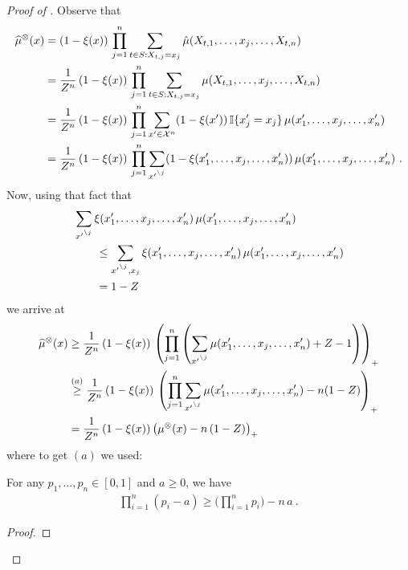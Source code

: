 \begin{proof}[Proof of ]
Observe that
\begin{align*}
  \widehat \mu^{\otimes}(x)
  &=
    (1-\xi(x)) \, \prod_{j=1}^n \sum_{t \in S : X_{t,j} = x_j} \hat \mu(X_{t,1}, \ldots, x_j, \ldots, X_{t,n})\\
  &=
    \frac{1}{Z^n} \, (1-\xi(x)) \, \prod_{j=1}^n \sum_{t \in S : X_{t,j} = x_j} \mu(X_{t,1}, \ldots, x_j, \ldots, X_{t,n})\\
  &=
    \frac{1}{Z^n} \, (1-\xi(x)) \, \prod_{j=1}^n \sum_{x' \in {\mathcal{X}}^n} (1-\xi(x')) \, \mathbb{I}\{x'_j = x_j\} \, \mu(x_1', \ldots, x_j, \ldots, x_n')\\
  &=
    \frac{1}{Z^n} \, (1-\xi(x)) \, \prod_{j=1}^n \sum_{{x'}^{^{\backslash j}}} (1-\xi(x'_1, \ldots, x_j, \ldots, x'_n)) \, \mu(x_1', \ldots, x_j, \ldots, x_n')~.
\end{align*}
% 
Now, using that fact that
\begin{align*}
  &\sum_{{x'}^{^{\backslash j}}} \xi(x'_1, \ldots, x_j, \ldots, x'_n) \, \mu(x_1', \ldots, x_j, \ldots, x_n')\\
  &\qquad\leq
    \sum_{{x'}^{^{\backslash j}}, x_j} \xi(x'_1, \ldots, x_j, \ldots, x'_n) \, \mu(x_1', \ldots, x_j, \ldots, x_n')\\
  &\qquad= 1-Z
\end{align*}
we arrive at
%
\begin{align*}
  \widehat \mu^{\otimes}(x)
  &\geq
    \frac{1}{Z^n} \, (1-\xi(x)) \, \left(  \prod_{j=1}^n \left(  \sum_{{x'}^{^{\backslash j}}} \mu(x_1', \ldots, x_j, \ldots, x_n')
    + Z - 1
     \right) \right)_+\\
  &\stackrel{(a)}{\geq}
    \frac{1}{Z^n} \, (1-\xi(x)) \, \left(  \prod_{j=1}^n \sum_{{x'}^{^{\backslash j}}}  \mu(x_1', \ldots, x_j, \ldots, x_n')
    - n (1-Z)  \right)_+\\
  &=
    \frac{1}{Z^n} \, (1-\xi(x)) \left(  \mu^{\otimes}(x) - n \, (1-Z)  \right)_+
\end{align*}
where to get $(a)$ we used:
%
\begin{proposition}
  For any $p_1, \ldots, p_n \in [0,1]$ and $a \geq 0$, we have
  \begin{align*}
    \prod_{i=1}^n (p_i - a) \geq \big( \prod_{i=1}^n p_i \big) - n \, a~.
  \end{align*}
\end{proposition}
\begin{proof}

\end{proof}
\end{proof}

